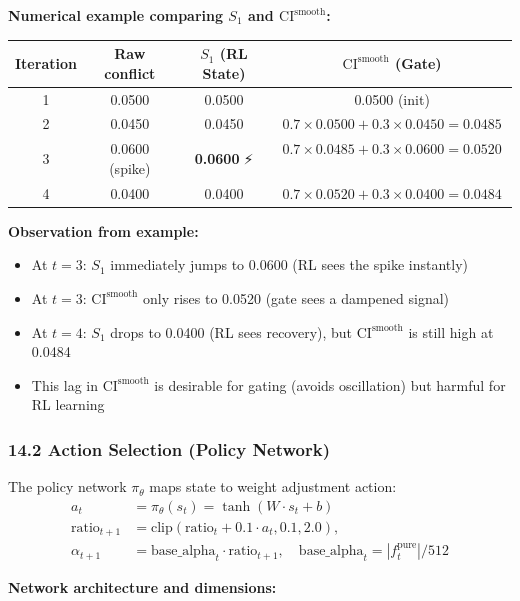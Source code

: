 \documentclass[11pt,a4paper]{article}
\begin{document}
\begin{itemize}
\textbf{Numerical example comparing $S_1$ and $\text{CI}^{\text{smooth}}$:}

\begin{center}
\begin{tabular}{|c|c|c|c|}
\hline
\textbf{Iteration} & \textbf{Raw conflict} & \textbf{$S_1$ (RL State)} & \textbf{$\text{CI}^{\text{smooth}}$ (Gate)} \\
\hline
1 & 0.0500 & 0.0500 & 0.0500 (init) \\
2 & 0.0450 & 0.0450 & $0.7 \times 0.0500 + 0.3 \times 0.0450 = 0.0485$ \\
3 & 0.0600 (spike) & \textbf{0.0600} ⚡ & $0.7 \times 0.0485 + 0.3 \times 0.0600 = 0.0520$ 🐌 \\
4 & 0.0400 & 0.0400 & $0.7 \times 0.0520 + 0.3 \times 0.0400 = 0.0484$ \\
\hline
\end{tabular}
\end{center}

\textbf{Observation from example:}
\begin{itemize}
    \item At $t=3$: $S_1$ immediately jumps to 0.0600 (RL sees the spike instantly)
    \item At $t=3$: $\text{CI}^{\text{smooth}}$ only rises to 0.0520 (gate sees a dampened signal)
    \item At $t=4$: $S_1$ drops to 0.0400 (RL sees recovery), but $\text{CI}^{\text{smooth}}$ is still high at 0.0484
    \item This lag in $\text{CI}^{\text{smooth}}$ is desirable for gating (avoids oscillation) but harmful for RL learning
\end{itemize}

\subsubsection*{14.2 Action Selection (Policy Network)}
The policy network $\pi_\theta$ maps state to weight adjustment action:
\begin{align}
a_t &= \pi_\theta(s_t) = \tanh(W \cdot s_t + b) \\
\text{ratio}_{t+1} &= \text{clip}(\text{ratio}_t + 0.1 \cdot a_t, 0.1, 2.0), \\
\alpha_{t+1} &= \text{base\_alpha}_t \cdot \text{ratio}_{t+1}, \quad \text{base\_alpha}_t = |f_t^{\text{pure}}|/512
\end{align}

\textbf{Network architecture and dimensions:}


\end{itemize}
\end{document}
